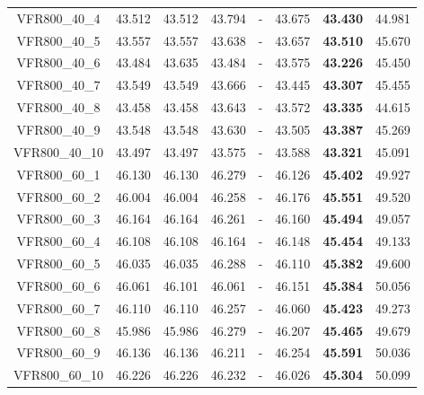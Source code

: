 \begin{tabular}{cc|ccc|ccc}
VFR800\_40\_4      & 43.512           & 43.512           & 43.794           & -                & 43.675           & {\bf 43.430}     & 44.981          \\ 
VFR800\_40\_5      & 43.557           & 43.557           & 43.638           & -                & 43.657           & {\bf 43.510}     & 45.670          \\ 
VFR800\_40\_6      & 43.484           & 43.635           & 43.484           & -                & 43.575           & {\bf 43.226}     & 45.450          \\ 
VFR800\_40\_7      & 43.549           & 43.549           & 43.666           & -                & 43.445           & {\bf 43.307}     & 45.455          \\ 
VFR800\_40\_8      & 43.458           & 43.458           & 43.643           & -                & 43.572           & {\bf 43.335}     & 44.615          \\ 
VFR800\_40\_9      & 43.548           & 43.548           & 43.630           & -                & 43.505           & {\bf 43.387}     & 45.269          \\ 
VFR800\_40\_10     & 43.497           & 43.497           & 43.575           & -                & 43.588           & {\bf 43.321}     & 45.091          \\ 
VFR800\_60\_1      & 46.130           & 46.130           & 46.279           & -                & 46.126           & {\bf 45.402}     & 49.927          \\ 
VFR800\_60\_2      & 46.004           & 46.004           & 46.258           & -                & 46.176           & {\bf 45.551}     & 49.520          \\ 
VFR800\_60\_3      & 46.164           & 46.164           & 46.261           & -                & 46.160           & {\bf 45.494}     & 49.057          \\ 
VFR800\_60\_4      & 46.108           & 46.108           & 46.164           & -                & 46.148           & {\bf 45.454}     & 49.133          \\ 
VFR800\_60\_5      & 46.035           & 46.035           & 46.288           & -                & 46.110           & {\bf 45.382}     & 49.600          \\ 
VFR800\_60\_6      & 46.061           & 46.101           & 46.061           & -                & 46.151           & {\bf 45.384}     & 50.056          \\ 
VFR800\_60\_7      & 46.110           & 46.110           & 46.257           & -                & 46.060           & {\bf 45.423}     & 49.273          \\ 
VFR800\_60\_8      & 45.986           & 45.986           & 46.279           & -                & 46.207           & {\bf 45.465}     & 49.679          \\ 
VFR800\_60\_9      & 46.136           & 46.136           & 46.211           & -                & 46.254           & {\bf 45.591}     & 50.036          \\ 
VFR800\_60\_10     & 46.226           & 46.226           & 46.232           & -                & 46.026           & {\bf 45.304}     & 50.099          \\ 
\end{tabular}
